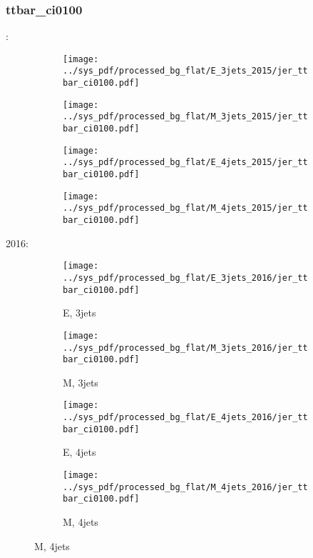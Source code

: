 \documentclass{beamer}
\begin{document}
\begin{frame}
\frametitle{ttbar_ci0100}
\fontsize{5}{1}:
\begin{figure}
\centering
\begin{subfigure}[b]{0.24\textwidth}
\texttt{[image: ../sys\_pdf/processed\_bg\_flat/E\_3jets\_2015/jer\_ttbar\_ci0100.pdf]}
\end{subfigure}
\begin{subfigure}[b]{0.24\textwidth}
\texttt{[image: ../sys\_pdf/processed\_bg\_flat/M\_3jets\_2015/jer\_ttbar\_ci0100.pdf]}
\end{subfigure}
\begin{subfigure}[b]{0.24\textwidth}
\texttt{[image: ../sys\_pdf/processed\_bg\_flat/E\_4jets\_2015/jer\_ttbar\_ci0100.pdf]}
\end{subfigure}
\begin{subfigure}[b]{0.24\textwidth}
\texttt{[image: ../sys\_pdf/processed\_bg\_flat/M\_4jets\_2015/jer\_ttbar\_ci0100.pdf]}
\end{subfigure}
\end{figure}
2016:
\begin{figure}
\centering
\begin{subfigure}[b]{0.24\textwidth}
\texttt{[image: ../sys\_pdf/processed\_bg\_flat/E\_3jets\_2016/jer\_ttbar\_ci0100.pdf]}
\captionsetup{font=tiny}
\caption{E, 3jets}
\end{subfigure}
\begin{subfigure}[b]{0.24\textwidth}
\texttt{[image: ../sys\_pdf/processed\_bg\_flat/M\_3jets\_2016/jer\_ttbar\_ci0100.pdf]}
\captionsetup{font=tiny}
\caption{M, 3jets}
\end{subfigure}
\begin{subfigure}[b]{0.24\textwidth}
\texttt{[image: ../sys\_pdf/processed\_bg\_flat/E\_4jets\_2016/jer\_ttbar\_ci0100.pdf]}
\captionsetup{font=tiny}
\caption{E, 4jets}
\end{subfigure}
\begin{subfigure}[b]{0.24\textwidth}
\texttt{[image: ../sys\_pdf/processed\_bg\_flat/M\_4jets\_2016/jer\_ttbar\_ci0100.pdf]}
\captionsetup{font=tiny}
\caption{M, 4jets}
\end{subfigure}
\end{figure}
\end{frame}
\end{document}
